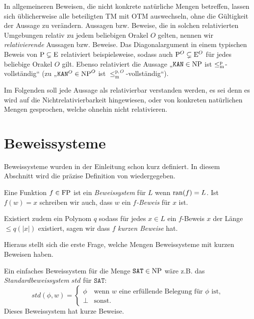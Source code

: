 In allgemeineren Beweisen, die nicht konkrete natürliche Mengen betreffen, lassen sich üblicherweise alle beteiligten TM mit OTM auswechseln, ohne die Gültigkeit der Aussage zu verändern.
Aussagen bzw. Beweise, die in solchen relativierten Umgebungen relativ zu jedem beliebigen Orakel $O$ gelten, nennen wir \emph{relativierende} Aussagen bzw. Beweise.
Das Diagonalargument in einem typischen Beweis von $\P\subsetneq\mathrm{E}$ relativiert beispielsweise, sodass auch $\P^O\subsetneq\mathrm{E}^O$ für jedes beliebige Orakel $O$ gilt. 
Ebenso relativiert die Aussage „$\mathtt{KAN}\in\NP$ ist $\leqmp$-vollständig“ (zu „$\mathtt{KAN}^O\in\NP^O$ ist $\leq_\mathrm{m}^{\mathrm{p},O}$-vollständig“).

Im Folgenden soll jede Aussage als relativierbar verstanden werden, es sei denn es wird auf die Nichtrelativierbarkeit hingewiesen, oder von konkreten natürlichen Mengen gesprochen, welche ohnehin nicht relativieren.


\section{Beweissysteme}\label{sec:prelim-ps}

Beweissysteme wurden in der Einleitung schon kurz definiert. In diesem Abschnitt wird die präzise Definition von \textcite{cook_relative_1979} wiedergegeben.
\begin{definition}
Eine Funktion $f\in \FP$ ist ein \emph{Beweissystem} für $L$ wenn $\ran(f)=L$.
Ist $f(w)=x$ schreiben wir auch, dass $w$ ein \emph{$f$-Beweis} für $x$ ist.

Existiert zudem ein Polynom $q$ sodass für jedes $x\in L$ ein $f$-Beweis $x$ der Länge $\leq q(|x|)$ existiert, sagen wir dass $f$ \emph{kurzen Beweise} hat.
\end{definition}
Hieraus stellt sich die erste Frage, welche Mengen Beweissysteme mit kurzen Beweisen haben.

Ein einfaches Beweissystem für die Menge $\mathtt{SAT}\in\NP$ wäre z.B. das \emph{Standardbeweissystem} $\mathit{std}$ für $\mathtt{SAT}$:
\[ \mathit{std}(\phi, w) = \begin{cases} \phi & \text{wenn $w$ eine erfüllende Belegung für $\phi$ ist,} \\ \bot & \text{sonst.} \end{cases} \]
Dieses Beweissystem hat kurze Beweise.

